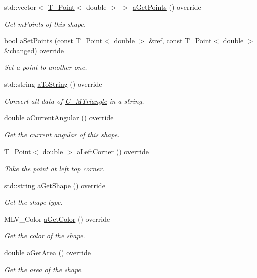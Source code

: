 \begin{DoxyCompactItemize}
std\+::vector$<$ \hyperlink{classT__Point}{T\+\_\+\+Point}$<$ double $>$ $>$ \hyperlink{classC__MTriangle_ada409f8f1015cf7bf9f9ab8fb11da94b}{a\+Get\+Points} () override
\begin{DoxyCompactList}\small\item\em Get m\+Points of this shape. \end{DoxyCompactList}\item 
bool \hyperlink{classC__MTriangle_a5a3971eb0aafc16e5a34bd94130d7c6b}{a\+Set\+Points} (const \hyperlink{classT__Point}{T\+\_\+\+Point}$<$ double $>$ \&ref, const \hyperlink{classT__Point}{T\+\_\+\+Point}$<$ double $>$ \&changed) override
\begin{DoxyCompactList}\small\item\em Set a point to another one. \end{DoxyCompactList}\item 
std\+::string \hyperlink{classC__MTriangle_a3a769eb21278ec456292d88385b332a2}{a\+To\+String} () override
\begin{DoxyCompactList}\small\item\em Convert all data of \hyperlink{classC__MTriangle}{C\+\_\+\+M\+Triangle} in a string. \end{DoxyCompactList}\item 
double \hyperlink{classC__MTriangle_aad1e42f1ec9c486736a403128ba47179}{a\+Current\+Angular} () override
\begin{DoxyCompactList}\small\item\em Get the current angular of this shape. \end{DoxyCompactList}\item 
\hyperlink{classT__Point}{T\+\_\+\+Point}$<$ double $>$ \hyperlink{classC__MTriangle_ad077fce026711bf0a25fc4c1cb83ecb9}{a\+Left\+Corner} () override
\begin{DoxyCompactList}\small\item\em Take the point at left top corner. \end{DoxyCompactList}\item 
std\+::string \hyperlink{classC__MTriangle_aca7e38c6bf9695aacf54aa03ecfba978}{a\+Get\+Shape} () override
\begin{DoxyCompactList}\small\item\em Get the shape type. \end{DoxyCompactList}\item 
M\+L\+V\+\_\+\+Color \hyperlink{classC__MTriangle_aa567d77ce0e6d664beb6eea9268b1bc3}{a\+Get\+Color} () override
\begin{DoxyCompactList}\small\item\em Get the color of the shape. \end{DoxyCompactList}\item 
double \hyperlink{classC__MTriangle_a1baff5085fc1b9822987e3fc307550ce}{a\+Get\+Area} () override
\begin{DoxyCompactList}\small\item\em Get the area of the shape. \end{DoxyCompactList}\end{DoxyCompactItemize}
